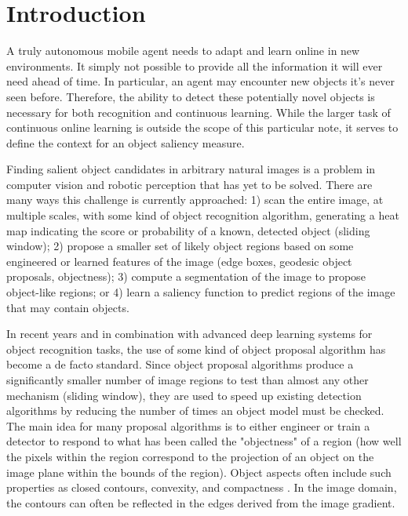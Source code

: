 \section{Introduction}
\label{sec:intro}
A truly autonomous mobile agent needs to adapt and learn online in new environments. It simply not possible to provide all the information it will ever need ahead of time. In particular, an agent may encounter new objects it's never seen before. Therefore, the ability to detect these potentially novel objects is necessary for both recognition and continuous learning. While the larger task of continuous online learning is outside the scope of this particular note, it serves to define the context for an object saliency measure.

Finding salient object candidates in arbitrary natural images is a problem in computer vision and robotic perception that has yet to be solved. There are many ways this challenge is currently approached: 1) scan the entire image, at multiple scales, with some kind of object recognition algorithm, generating a heat map indicating the score or probability of a known, detected object (\eg sliding window); 2) propose a smaller set of likely object regions based on some engineered or learned features of the image (\eg edge boxes\cite{zitnick_edge_2014}, geodesic object proposals\cite{krahenbuhl_geodesic_2014}, objectness); 3) compute a segmentation of the image to propose object-like regions; or 4) learn a saliency function to predict regions of the image that may contain objects.

In recent years and in combination with advanced deep learning systems for object recognition tasks, the use of some kind of object proposal algorithm has become a de facto standard. Since object proposal algorithms produce a significantly smaller number of image regions to test than almost any other mechanism (\eg sliding window), they are used to speed up existing detection algorithms by reducing the number of times an object model must be checked. The main idea for many proposal algorithms is to either engineer or train a detector to respond to what has been called the "objectness" of a region (\ie how well the pixels within the region correspond to the projection of an object on the image plane within the bounds of the region). Object aspects often include such properties as closed contours, convexity, and compactness \cite{koffka_principles_1935}. In the image domain, the contours can often be reflected in the edges derived from the image gradient.

